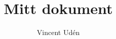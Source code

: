 \documentclass[a4paper, 12]{article}
\begin{document}
\title{Mitt dokument}
\author{Vincent Udén}
\end{document}
